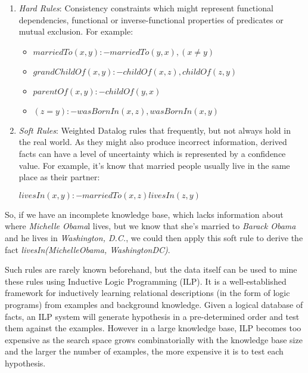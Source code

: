 \begin{enumerate}
 \item \emph{Hard Rules}: Consistency constraints which might represent functional dependencies, functional or
inverse-functional properties of predicates or mutual exclusion. For example:
    \begin{itemize}
      \item \begin{math} marriedTo(x,y) :- marriedTo(y,x),(x \neq y)\end{math}
      \item \begin{math} grandChildOf(x,y) :- childOf(x,z),childOf(z,y)\end{math}
      \item \begin{math} parentOf(x,y) :- childOf(y,x)\end{math}
      \item \begin{math} (z=y) :- wasBornIn(x,z),wasBornIn(x,y)\end{math}
    \end{itemize}

 \item \emph{Soft Rules}: Weighted Datalog rules that frequently, but not always hold in the real world. As they
might also produce incorrect information, derived facts can have a level of uncertainty which is represented by a
confidence value. For example, it's know that married people usually live in the same place as their partner:
    \begin{center}
      \begin{math} livesIn(x,y) :- marriedTo(x,z)livesIn(z,y)\end{math}
    \end{center}
\end{enumerate}

So, if we have an incomplete knowledge base, which lacks information about where \emph{Michelle Obama}l lives, but
we know that she's married to \emph{Barack Obama} and he lives in \emph{Washington, D.C.}, we could then apply this soft
rule to derive the fact \emph{livesIn(MichelleObama, WashingtonDC)}. 


Such rules are rarely known beforehand, but the data itself can be used to mine these rules using Inductive Logic
Programming (ILP). It is a well-established framework for inductively learning relational descriptions (in the form of
logic programs) from examples and background knowledge. Given a logical database of facts, an ILP system will generate
hypothesis in a pre-determined order and test them against the examples. However in a large knowledge base, ILP becomes
too expensive as the search space grows combinatorially with the knowledge base size and the larger the number of
examples, the more expensive it is to test each hypothesis.

